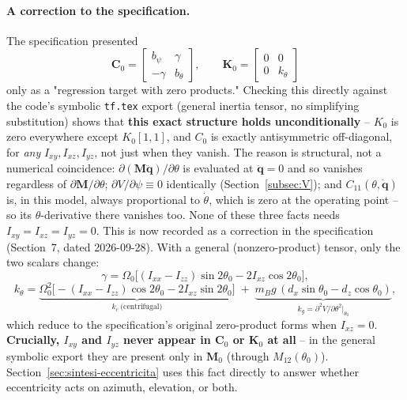 \documentclass[11pt,a4paper]{article}
\numberwithin{equation}{section}
\newcommand{\bs}[1]{\boldsymbol{#1}}
\begin{document}
\paragraph{A correction to the specification.} The specification presented
\begin{equation}
\bs C_0 = \begin{bmatrix} b_\psi & \gamma \\ -\gamma & b_\theta \end{bmatrix},
\qquad
\bs K_0 = \begin{bmatrix} 0 & 0 \\ 0 & k_\theta \end{bmatrix}
\label{eq:C0K0}
\end{equation}
only as a "regression target with zero products." Checking this directly against the code's symbolic \texttt{tf.tex} export (general inertia tensor, no simplifying substitution) shows that \textbf{this exact structure holds unconditionally} -- $K_0$ is zero everywhere except $K_0[1,1]$, and $C_0$ is exactly antisymmetric off-diagonal, for \emph{any} $I_{xy},I_{xz},I_{yz}$, not just when they vanish. The reason is structural, not a numerical coincidence: $\partial(\bs M\ddot{\bs q})/\partial\theta$ is evaluated at $\ddot{\bs q}=0$ and so vanishes regardless of $\partial\bs M/\partial\theta$; $\partial V/\partial\psi \equiv 0$ identically (Section~\ref{subsec:V}); and $C_{11}(\theta,\dot{\bs q})$ is, in this model, always proportional to $\dot\theta$, which is zero at the operating point -- so its $\theta$-derivative there vanishes too. None of these three facts needs $I_{xy}=I_{xz}=I_{yz}=0$. This is now recorded as a correction in the specification (Section~7, dated 2026-09-28). With a general (nonzero-product) tensor, only the two scalars change:
\begin{equation}
\gamma = \Omega_0\big[(I_{xx} - I_{zz})\sin 2\theta_0 - 2I_{xz}\cos2\theta_0\big],
\label{eq:gamma}
\end{equation}
\begin{equation}
k_\theta = \underbrace{\Omega_0^2\big[-(I_{xx}-I_{zz})\cos2\theta_0 - 2I_{xz}\sin2\theta_0\big]}_{\displaystyle k_c\ \text{(centrifugal)}}
\;+\;
\underbrace{m_B g\,(d_x\sin\theta_0 - d_z\cos\theta_0)}_{\displaystyle k_g = \partial^2V/\partial\theta^2\big|_{\theta_0}} ,
\label{eq:ktheta}
\end{equation}
which reduce to the specification's original zero-product forms when $I_{xz}=0$. \textbf{Crucially, $I_{xy}$ and $I_{yz}$ never appear in $\bs C_0$ or $\bs K_0$ at all} -- in the general symbolic export they are present only in $\bs M_0$ (through $M_{12}(\theta_0)$). Section~\ref{sec:sintesi-eccentricita} uses this fact directly to answer whether eccentricity acts on azimuth, elevation, or both.
\end{document}
